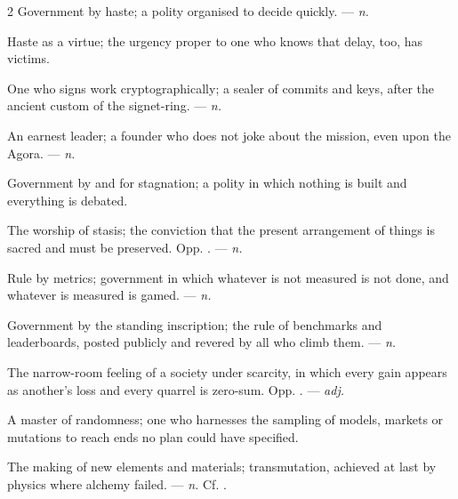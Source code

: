\begin{multicols}{2}
 Government by haste; a polity organised to decide quickly. —  \textit{n.}

 Haste as a virtue; the urgency proper to one who knows that delay, too, has victims.

 One who signs work cryptographically; a sealer of commits and keys, after the ancient custom of the signet-ring. —  \textit{n.}

 An earnest leader; a founder who does not joke about the mission, even upon the Agora. —  \textit{n.}

 Government by and for stagnation; a polity in which nothing is built and everything is debated.

 The worship of stasis; the conviction that the present arrangement of things is sacred and must be preserved. Opp. . —  \textit{n.}

 Rule by metrics; government in which whatever is not measured is not done, and whatever is measured is gamed. —  \textit{n.}

 Government by the standing inscription; the rule of benchmarks and leaderboards, posted publicly and revered by all who climb them. —  \textit{n.}

 The narrow-room feeling of a society under scarcity, in which every gain appears as another's loss and every quarrel is zero-sum. Opp. . —  \textit{adj.}

 A master of randomness; one who harnesses the sampling of models, markets or mutations to reach ends no plan could have specified.

 The making of new elements and materials; transmutation, achieved at last by physics where alchemy failed. —  \textit{n.} Cf. .


\end{multicols}
